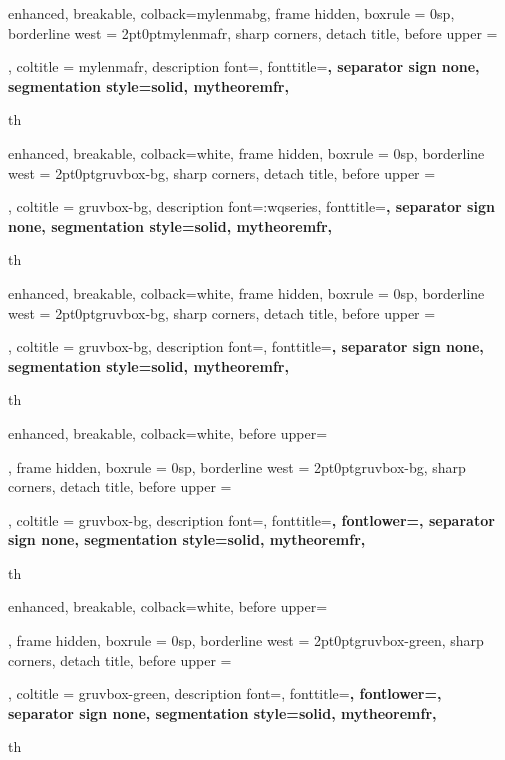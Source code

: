 {
	enhanced,
	breakable,
	colback=mylenmabg,
	frame hidden,
	boxrule = 0sp,
	borderline west = {2pt}{0pt}{mylenmafr},
	sharp corners,
	detach title,
	before upper = \tcbtitle\par\smallskip,
	coltitle = mylenmafr,
	description font=\mdseries{}\selectfont,
	fonttitle=\selectfont\bfseries,
	separator sign none,
	segmentation style={solid, mytheoremfr},
}
{th}


{
	enhanced,
	breakable,
	colback=white,
	frame hidden,
	boxrule = 0sp,
	borderline west = {2pt}{0pt}{gruvbox-bg},
	sharp corners,
	detach title,
	before upper = \tcbtitle\par\smallskip,
	coltitle = gruvbox-bg,
	description font=\md:wqseries\selectfont,
	fonttitle=\selectfont\bfseries,
	separator sign none,
	segmentation style={solid, mytheoremfr},
}
{th}


{
	enhanced,
	breakable,
	colback=white,
	frame hidden,
	boxrule = 0sp,
	borderline west = {2pt}{0pt}{gruvbox-bg},
	sharp corners,
	detach title,
	before upper = \tcbtitle\par\smallskip,
	coltitle = gruvbox-bg,
	description font=\mdseries{}\selectfont,
	fonttitle=\selectfont\bfseries,
	separator sign none,
	segmentation style={solid, mytheoremfr},
}
{th}


{
	enhanced,
	breakable,
	colback=white,
  before upper=\tcbtitle\par\Hugeskip,
	frame hidden,
	boxrule = 0sp,
	borderline west = {2pt}{0pt}{gruvbox-bg},
	sharp corners,
	detach title,
	before upper = \tcbtitle\par\smallskip,
	coltitle = gruvbox-bg,
	description font=\mdseries{}\selectfont,
	fonttitle=\selectfont\bfseries,
	fontlower=\selectfont,
  separator sign none,
	segmentation style={solid, mytheoremfr},
}
{th}

{
	enhanced,
	breakable,
	colback=white,
  before upper=\tcbtitle\par\Hugeskip,
	frame hidden,
	boxrule = 0sp,
	borderline west = {2pt}{0pt}{gruvbox-green},
	sharp corners,
	detach title,
	before upper = \tcbtitle\par\smallskip,
	coltitle = gruvbox-green,
	description font=\mdseries{}\selectfont,
	fonttitle=\selectfont\bfseries,
	fontlower=\selectfont,
  separator sign none,
	segmentation style={solid, mytheoremfr},
}
{th}

